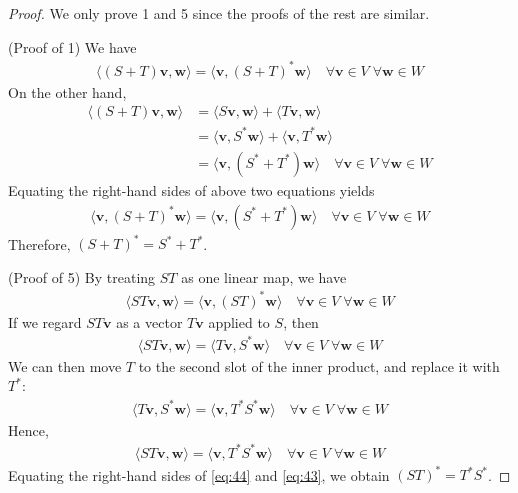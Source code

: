 \documentclass[thmcnt=section, color=blue, 12pt]{my-elegantbook}
\begin{document}
\begin{proof}
	We only prove 1 and 5 since the proofs of the rest are similar.


	(Proof of 1) We have 
	\begin{align*}
		\langle (S + T) \mathbf{v}, \mathbf{w} \rangle
		= \langle \mathbf{v}, (S + T)^\ast \mathbf{w} \rangle
		\quad \forall \mathbf{v} \in V \; \forall \mathbf{w} \in W
	\end{align*}
	On the other hand, 
	\begin{align*}
		\langle (S + T) \mathbf{v}, \mathbf{w} \rangle
		&= \langle S \mathbf{v}, \mathbf{w} \rangle
			+\langle T \mathbf{v}, \mathbf{w} \rangle \\
		&= \langle \mathbf{v}, S^\ast \mathbf{w} \rangle
			+\langle \mathbf{v}, T^\ast \mathbf{w} \rangle \\
		&= \langle \mathbf{v}, (S^\ast + T^\ast) \mathbf{w} \rangle
		\quad \forall \mathbf{v} \in V \; \forall \mathbf{w} \in W
	\end{align*}
	Equating the right-hand sides of above two equations yields
	\begin{align*}
		\langle \mathbf{v}, (S + T)^\ast \mathbf{w} \rangle
		= \langle \mathbf{v}, (S^\ast + T^\ast) \mathbf{w} \rangle
		\quad \forall \mathbf{v} \in V \; \forall \mathbf{w} \in W
	\end{align*}
	Therefore, $(S + T)^\ast = S^\ast + T^\ast$.

	(Proof of 5) By treating $S T$ as one linear map, we have 
	\begin{align}
		\langle S T \mathbf{v}, \mathbf{w} \rangle
		= \langle \mathbf{v}, (ST)^\ast \mathbf{w} \rangle
		\quad \forall \mathbf{v} \in V \; \forall \mathbf{w} \in W
		\label{eq:44}
	\end{align}
	If we regard $ST \mathbf{v}$ as a vector $T\mathbf{v}$ applied to $S$,
	then 
	\begin{align*}
		\langle S T \mathbf{v}, \mathbf{w} \rangle
		= \langle T \mathbf{v}, S^\ast \mathbf{w} \rangle
		\quad \forall \mathbf{v} \in V \; \forall \mathbf{w} \in W
	\end{align*}
	We can then move $T$ to the second slot of the inner product,
	and replace it with $T^\ast$:
	\begin{align*}
		\langle T \mathbf{v}, S^\ast \mathbf{w} \rangle
		= \langle \mathbf{v}, T^\ast S^\ast \mathbf{w} \rangle
		\quad \forall \mathbf{v} \in V \; \forall \mathbf{w} \in W
	\end{align*}
	Hence, 
	\begin{align}
		\langle S T \mathbf{v}, \mathbf{w} \rangle
		= \langle \mathbf{v}, T^\ast S^\ast \mathbf{w} \rangle
		\quad \forall \mathbf{v} \in V \; \forall \mathbf{w} \in W
		\label{eq:43}
	\end{align}
	Equating the right-hand sides of \eqref{eq:44} and \eqref{eq:43},
	we obtain $(ST)^\ast = T^\ast S^\ast$.
\end{proof}
\end{document}
